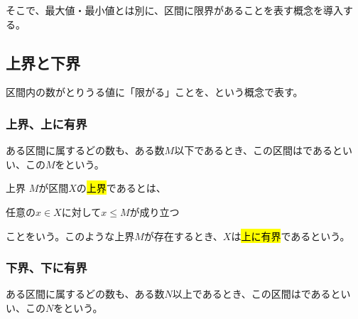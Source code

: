 \documentclass[../math-imaging]{subfiles}
\begin{document}
そこで、最大値・最小値とは別に、区間に限界があることを表す概念を導入する。

\subsection{上界と下界}

区間内の数がとりうる値に「限がる」ことを、という概念で表す。

\subsubsection{上界、上に有界}

ある区間に属するどの数も、ある数$M$以下であるとき、この区間はであるといい、この$M$をという。

\begin{definition}{上界}
  $M$が区間$X$の\hl{上界}であるとは、
  \begin{center}
    任意の$x \in X$に対して$x \leq M$が成り立つ
  \end{center}
  ことをいう。このような上界$M$が存在するとき、$X$は\hl{上に有界}であるという。
\end{definition}

\begin{center}
\end{center}

\subsubsection{下界、下に有界}

ある区間に属するどの数も、ある数$N$以上であるとき、この区間はであるといい、この$N$をという。
\end{document}
